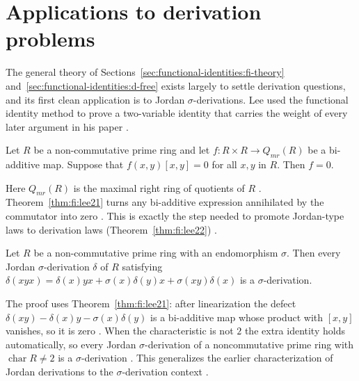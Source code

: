 \section{Applications to derivation problems}\label{sec:functional-identities:applications-to-derivations}

The general theory of
Sections~\ref{sec:functional-identities:fi-theory}
and~\ref{sec:functional-identities:d-free} exists largely to settle
derivation questions, and its first clean application is to Jordan
$\sigma$-derivations. Lee used the functional identity method to prove
a two-variable identity that carries the weight of every later argument in
his paper \cite[Section~2, p.~221]{LeeTK2015JordanFI}.

\begin{theorem}\label{thm:fi:lee21}
Let $R$ be a non-commutative prime ring and let $f\colon R\times R\to
Q_{mr}(R)$ be a bi-additive map. Suppose that $f(x,y)[x,y]=0$ for all
$x,y$ in $R$. Then $f=0$.
\end{theorem}

Here $Q_{mr}(R)$ is the maximal right ring of quotients of $R$
\cite[p.~221]{LeeTK2015JordanFI}. Theorem~\ref{thm:fi:lee21} turns any
bi-additive expression annihilated by the commutator into zero
\cite[p.~221]{LeeTK2015JordanFI}. This is exactly the step needed to
promote Jordan-type laws to derivation laws (Theorem~\ref{thm:fi:lee22})
\cite[p.~221]{LeeTK2015JordanFI}.\begin{theorem}\label{thm:fi:lee22}
Let $R$ be a non-commutative prime ring with an endomorphism $\sigma$.
Then every Jordan $\sigma$-derivation $\delta$ of $R$ satisfying
$\delta(xyx)=\delta(x)yx+\sigma(x)\delta(y)x+\sigma(xy)\delta(x)$ is a
$\sigma$-derivation.
\end{theorem}

The proof uses Theorem~\ref{thm:fi:lee21}: after linearization the defect
$\delta(xy)-\delta(x)y-\sigma(x)\delta(y)$ is a bi-additive map whose
product with $[x,y]$ vanishes, so it is zero
\cite[p.~221]{LeeTK2015JordanFI}. When the characteristic is not $2$ the
extra identity holds automatically, so every Jordan $\sigma$-derivation of
a noncommutative prime ring with $\operatorname{char}R\ne 2$ is a
$\sigma$-derivation \cite[Corollary~2.3, p.~221]{LeeTK2015JordanFI}. This
generalizes the earlier characterization of Jordan derivations to the
$\sigma$-derivation context \cite[p.~221]{LeeTK2015JordanFI}.

